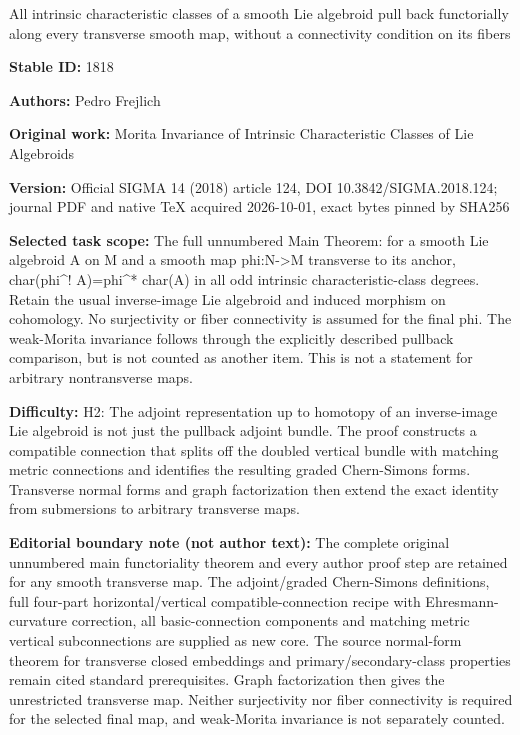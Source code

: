 \documentclass[11pt]{article}
\numberwithin{equation}{section}
\newcommand{\8}{\infty}
\begin{document}
\begin{center}\Large All intrinsic characteristic classes of a smooth Lie algebroid pull back functorially along every transverse smooth map, without a connectivity condition on its fibers\end{center}
\noindent\textbf{Stable ID:} 1818\par
\noindent\textbf{Authors:} Pedro Frejlich\par
\noindent\textbf{Original work:} Morita Invariance of Intrinsic Characteristic Classes of Lie Algebroids\par
\noindent\textbf{Version:} Official SIGMA 14 (2018) article 124, DOI 10.3842/SIGMA.2018.124; journal PDF and native TeX acquired 2026-10-01, exact bytes pinned by SHA256\par
\noindent\textbf{Selected task scope:} The full unnumbered Main Theorem: for a smooth Lie algebroid A on M and a smooth map phi:N->M transverse to its anchor, char(phi\textasciicircum{}! A)=\allowbreak{}phi\textasciicircum{}*\allowbreak{} char(A) in all odd intrinsic characteristic-class degrees. Retain the usual inverse-image Lie algebroid and induced morphism on cohomology. No surjectivity or fiber connectivity is assumed for the final phi. The weak-Morita invariance follows through the explicitly described pullback comparison, but is not counted as another item. This is not a statement for arbitrary nontransverse maps.\par
\noindent\textbf{Difficulty:} H2: The adjoint representation up to homotopy of an inverse-image Lie algebroid is not just the pullback adjoint bundle. The proof constructs a compatible connection that splits off the doubled vertical bundle with matching metric connections and identifies the resulting graded Chern-Simons forms. Transverse normal forms and graph factorization then extend the exact identity from submersions to arbitrary transverse maps.\par
\noindent\textbf{Editorial boundary note (not author text):} The complete original unnumbered main functoriality theorem and every author proof step are retained for any smooth transverse map. The adjoint/graded Chern-Simons definitions, full four-part horizontal/vertical compatible-connection recipe with Ehresmann-curvature correction, all basic-connection components and matching metric vertical subconnections are supplied as new core. The source normal-form theorem for transverse closed embeddings and primary/secondary-class properties remain cited standard prerequisites. Graph factorization then gives the unrestricted transverse map. Neither surjectivity nor fiber connectivity is required for the selected final map, and weak-Morita invariance is not separately counted.\par
\end{document}
